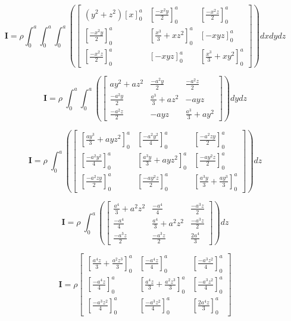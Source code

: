 \[\bm{I} = \rho \int_0^a \int_0^a \int_0^a  \left(\begin{bmatrix}(y^2 + z^2)\left[x\right]_0^a & \left[\frac{-x^2y}{2}\right]_0^a & \left[\frac{-x^2z}{2}\right]_0^a \\ \left[\frac{-x^2y}{2}\right]_0^a & \left[\frac{x^3}{3} + xz^2\right]_0^a & \left[-xyz\right]_0^a \\ \left[\frac{-x^2z}{2}\right]_0^a & \left[-xyz\right]_0^a & \left[\frac{x^3}{3} + xy^2\right]_0^a \end{bmatrix}\right)dxdydz\]

\[\bm{I} = \rho \ \int_0^a \int_0^a  \left(\begin{bmatrix}ay^2 + az^2 & \frac{-a^2y}{2} & \frac{-a^2z}{2} \\ \frac{-a^2y}{2} & \frac{a^3}{3} + az^2 & -ayz \\ \frac{-a^2z}{2} & -ayz & \frac{a^3}{3} + ay^2 \end{bmatrix}\right)dydz\]

\[\bm{I} = \rho \ \int_0^a  \left(\begin{bmatrix}\left[\frac{ay^3}{3} + ayz^2\right]_0^a & \left[\frac{-a^2y^2}{4}\right]_0^a & \left[\frac{-a^2zy}{2}\right]_0^a \\ \left[\frac{-a^2y^2}{4}\right]_0^a & \left[\frac{a^3y}{3} + ayz^2\right]_0^a & \left[\frac{-ay^2z}{2}\right]_0^a \\ \left[\frac{-a^2zy}{2}\right]_0^a & \left[\frac{-ay^2z}{2}\right]_0^a & \left[\frac{a^3y}{3} + \frac{ay^3}{3}\right]_0^a \end{bmatrix}\right)dz\]

\[\bm{I} = \rho \ \int_0^a \left(\begin{bmatrix}\frac{a^4}{3} + a^2z^2 & \frac{-a^4}{4} & \frac{-a^3z}{2} \\ \frac{-a^4}{4} & \frac{a^4}{3} + a^2z^2 & \frac{-a^3z}{2} \\ \frac{-a^3z}{2} & \frac{-a^3z}{2} & \frac{2a^4}{3}\end{bmatrix}\right)dz\]


\[\bm{I} = \rho \begin{bmatrix} \left[\frac{a^4z}{3} + \frac{a^2z^3}{3}\right]_0^a & \left[\frac{-a^4z}{4}\right]_0^a & \left[\frac{-a^3z^2}{4}\right]_0^a \\ \left[\frac{-a^4z}{4}\right]_0^a & \left[\frac{a^4z}{3} + \frac{a^2z^3}{3}\right]_0^a & \left[\frac{-a^3z^2}{4}\right]_0^a \\ \left[\frac{-a^3z^2}{4}\right]_0^a & \left[\frac{-a^3z^2}{4}\right]_0^a & \left[\frac{2a^4z}{3}\right]_0^a \end{bmatrix}\]

